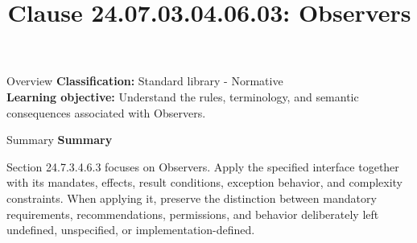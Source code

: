 \documentclass[10pt,letterpaper]{article}
\title{Clause 24.07.03.04.06.03: Observers}
\author{}
\date{}
\begin{document}
\maketitle
\begin{CornellOverviewBox}{Overview}
\textbf{Classification:} Standard library - Normative\\[2pt]
\textbf{Learning objective:} Understand the rules, terminology, and semantic consequences associated with Observers.
\end{CornellOverviewBox}\begin{CornellSummaryBox}{Summary}
{\sffamily\bfseries\color{Accent} Summary}\par\vspace{3pt}Section 24.7.3.4.6.3 focuses on Observers. Apply the specified interface together with its mandates, effects, result conditions, exception behavior, and complexity constraints. When applying it, preserve the distinction between mandatory requirements, recommendations, permissions, and behavior deliberately left undefined, unspecified, or implementation-defined.
\end{CornellSummaryBox}
\end{document}
